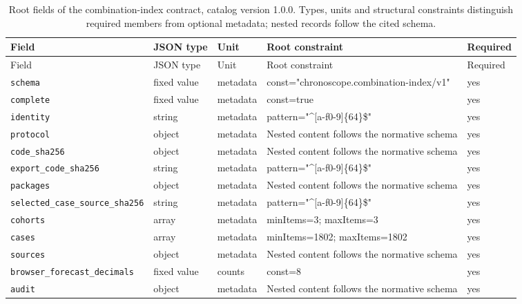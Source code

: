 \begingroup\small
\begin{longtable}{@{}p{}p{}p{}p{}p{}@{}}
\caption{Root fields of the combination-index contract, catalog version 1.0.0. Types, units and structural constraints distinguish required members from optional metadata; nested records follow the cited schema.}\label{tab:contract-combination-index}\\
\toprule Field & JSON type & Unit & Root constraint & Required\\\midrule\endfirsthead
\toprule Field & JSON type & Unit & Root constraint & Required\\\midrule\endhead
\texttt{schema} & fixed value & metadata & const="chronosco\allowbreak{}pe.combination-i\allowbreak{}ndex/v1" & yes\\
\texttt{complete} & fixed value & metadata & const=true & yes\\
\texttt{identity} & string & metadata & pattern="\textasciicircum{}[a-f0-9]\{64\}\$" & yes\\
\texttt{protocol} & object & metadata & Nested content follows the normative schema & yes\\
\texttt{code\_\allowbreak{}sha256} & object & metadata & Nested content follows the normative schema & yes\\
\texttt{export\_\allowbreak{}code\_\allowbreak{}sha256} & string & metadata & pattern="\textasciicircum{}[a-f0-9]\{64\}\$" & yes\\
\texttt{packages} & object & metadata & Nested content follows the normative schema & yes\\
\texttt{selected\_\allowbreak{}case\_\allowbreak{}source\_\allowbreak{}sha256} & string & metadata & pattern="\textasciicircum{}[a-f0-9]\{64\}\$" & yes\\
\texttt{cohorts} & array & metadata & minItems=3; maxItems=3 & yes\\
\texttt{cases} & array & metadata & minItems=1802; maxItems=1802 & yes\\
\texttt{sources} & object & metadata & Nested content follows the normative schema & yes\\
\texttt{browser\_\allowbreak{}forecast\_\allowbreak{}decimals} & fixed value & counts & const=8 & yes\\
\texttt{audit} & object & metadata & Nested content follows the normative schema & yes\\
\bottomrule
\end{longtable}
\endgroup

